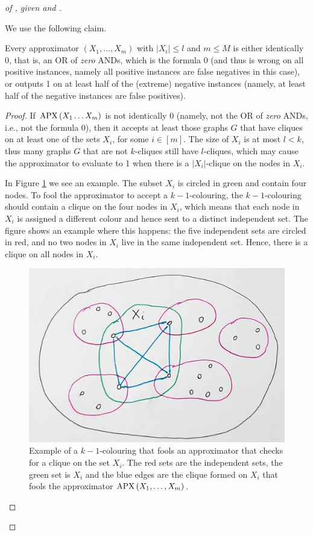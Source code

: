 \begin{proof}[of , given   and ]
\

We use the following claim. 

\begin{claim}\label{cla:internal-in-monotone-lower-bound}
 Every approximator  \APPX$\left(X_1, \ldots, X_m\right)$ with 
  $\left|X_i\right| \leq l$ and $m \leq M$ is either identically 0, that is, an OR of \emph{zero} ANDs, which is the formula $0$ (and thus is wrong on all positive instances, namely all positive instances are false negatives in this case), or outputs 1 on at least half of the (extreme) negative instances (namely, at least half of the negative instances are false positives).

\end{claim}
\begin{proof}
If $\operatorname{\mathrm{APX}}\left(X_1 \ldots X_m\right)$ is not identically 0 (namely, not the OR of \emph{zero} ANDs, i.e., not the formula $0$), then it accepts at least those graphs $G$ that have cliques on at least one of the sets $X_i$, for some $i\in[m]$. The size of $X_i$ is at most $ l<k$, thus many graphs $G$ that are not $k$-cliques still have $l$-cliques, which may cause the approximator to evaluate to 1 when there is a $|X_i|$-clique on the nodes in $X_i$.


In Figure \ref{fig:R(xi)}  we see an example. The subset $X_i$ is circled in green and contain four nodes. To fool the approximator to accept a $k-1$-colouring, the $k-1$-colouring should contain a clique on the four nodes in $X_i$, which means that each node in $X_i$ is assigned a different colour and hence sent to a distinct independent set. The figure shows an example where this happens: the five independent sets are circled in red, and no two nodes in $X_i$ live in the same independent set. Hence, there is a clique on all nodes in $X_i$.
\begin{figure}[H] 
    \centering
    \includegraphics[width=.6\linewidth]{images/R(Xi)-lemma-cliques.png}
        \caption{Example of a $k-1$-colouring that fools an approximator that checks for a clique on  the set $X_i$. The red sets are the independent sets, the green set is $X_i$ and the blue edges are the clique formed on $X_i$ that fools the approximator $\operatorname{\mathrm{APX}}\left(X_1, \ldots, X_m\right)$.}
    \label{fig:R(xi)}
\end{figure}


\end{proof}
\end{proof}
